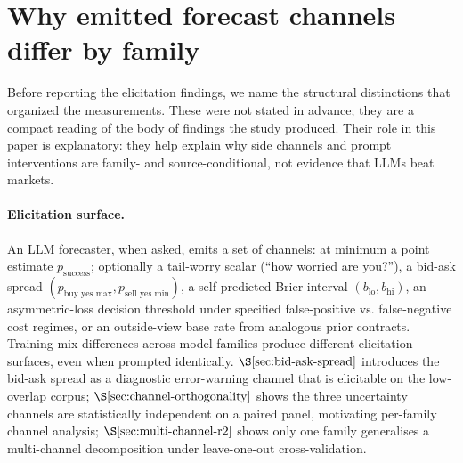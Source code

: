 \documentclass[11pt]{article}
\begin{document}
\section{Why emitted forecast channels differ by family}
\label{sec:theoretical-frame}

Before reporting the elicitation findings, we name the structural distinctions that organized the measurements. These were not stated in advance; they are a compact reading of the body of findings the study produced. Their role in this paper is explanatory: they help explain why side channels and prompt interventions are family- and source-conditional, not evidence that LLMs beat markets.

\paragraph{Elicitation surface.} An LLM forecaster, when asked, emits a set of channels: at minimum a point estimate $p_{\text{success}}$; optionally a tail-worry scalar (``how worried are you?''), a bid-ask spread $(p_{\text{buy yes max}}, p_{\text{sell yes min}})$, a self-predicted Brier interval $(b_{\text{lo}}, b_{\text{hi}})$, an asymmetric-loss decision threshold under specified false-positive vs. false-negative cost regimes, or an outside-view base rate from analogous prior contracts. Training-mix differences across model families produce different elicitation surfaces, even when prompted identically. $\S\ref{sec:bid-ask-spread}$ introduces the bid-ask spread as a diagnostic error-warning channel that is elicitable on the low-overlap corpus; $\S\ref{sec:channel-orthogonality}$ shows the three uncertainty channels are statistically independent on a paired panel, motivating per-family channel analysis; $\S\ref{sec:multi-channel-r2}$ shows only one family generalises a multi-channel decomposition under leave-one-out cross-validation.
\end{document}
